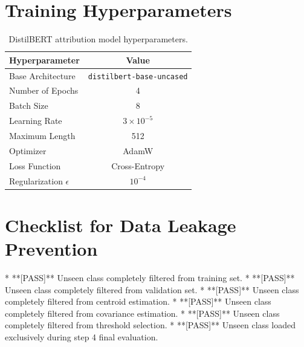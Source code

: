 \documentclass[12pt,a4paper]{report}
\begin{document}
\newpage
\begin{appendices}

\chapter{Training Hyperparameters}
\begin{table}[h]
\centering
\begin{tabular}{lc}
\toprule
\textbf{Hyperparameter} & \textbf{Value} \\
\midrule
Base Architecture & \texttt{distilbert-base-uncased} \\
Number of Epochs & 4 \\
Batch Size & 8 \\
Learning Rate & $3 \times 10^{-5}$ \\
Maximum Length & 512 \\
Optimizer & AdamW \\
Loss Function & Cross-Entropy \\
Regularization $\epsilon$ & $10^{-4}$ \\
\bottomrule
\end{tabular}
\caption{DistilBERT attribution model hyperparameters.}
\end{table}

\chapter{Checklist for Data Leakage Prevention}
*   **[PASS]** Unseen class completely filtered from training set.
*   **[PASS]** Unseen class completely filtered from validation set.
*   **[PASS]** Unseen class completely filtered from centroid estimation.
*   **[PASS]** Unseen class completely filtered from covariance estimation.
*   **[PASS]** Unseen class completely filtered from threshold selection.
*   **[PASS]** Unseen class loaded exclusively during step 4 final evaluation.

\end{appendices}
\end{document}
